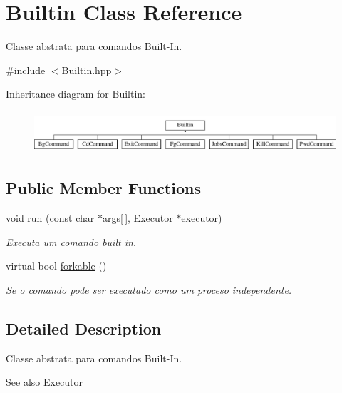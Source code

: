 \hypertarget{classBuiltin}{
\section{Builtin Class Reference}
\label{classBuiltin}
}


Classe abstrata para comandos Built-\/In.  




{\ttfamily \#include $<$Builtin.hpp$>$}

Inheritance diagram for Builtin:\begin{figure}[H]
\begin{center}
\leavevmode
\includegraphics[height=1.568627cm]{classBuiltin}
\end{center}
\end{figure}
\subsection*{Public Member Functions}
\begin{DoxyCompactItemize}
\item 
void \hyperlink{classBuiltin_a644e21a1429bd2e0603b89bd807e521d}{run} (const char $\ast$args\mbox{[}$\,$\mbox{]}, \hyperlink{classExecutor}{Executor} $\ast$executor)
\begin{DoxyCompactList}\small\item\em Executa um comando built in. \item\end{DoxyCompactList}\item 
virtual bool \hyperlink{classBuiltin_a91ec773bbed5e1a8808955d9b48e664b}{forkable} ()
\begin{DoxyCompactList}\small\item\em Se o comando pode ser executado como um proceso independente. \item\end{DoxyCompactList}\end{DoxyCompactItemize}


\subsection{Detailed Description}
Classe abstrata para comandos Built-\/In. \begin{DoxySeeAlso}{See also}
\hyperlink{classExecutor}{Executor} 
\end{DoxySeeAlso}


